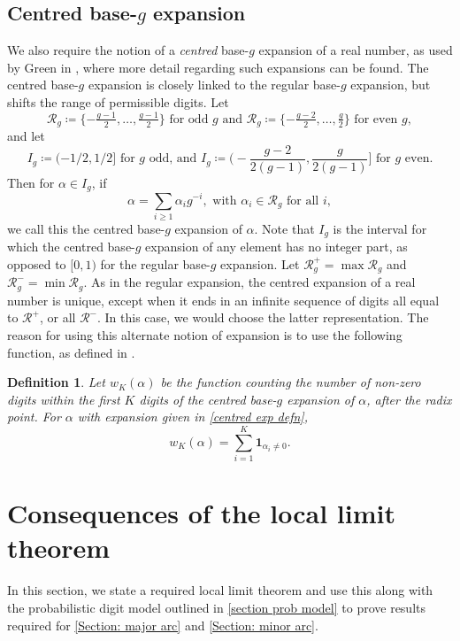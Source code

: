 \documentclass[hidelinks,11pt,reqno]{amsart}
\renewcommand{\geq}{\geqslant}
\newcommand{\ind}{\mathbf{1}}
\newtheorem{defn}[prop]{Definition}
\theoremstyle{remark}
\begin{document}
\subsection{Centred base-$g$ expansion}\label{section centred exp}
We also require the notion of a \textit{centred} base-$g$ expansion of a real number, as used by Green in \cite{green2025waring}, where more detail regarding such expansions can be found. The centred base-$g$ expansion is closely linked to the regular base-$g$ expansion, but shifts the range of permissible digits. Let
\[\mathcal{R}_{g}\coloneq \{-\tfrac{g-1}{2},\ldots, \tfrac{g-1}{2}\}\textrm{ for odd }g \textrm{ and }\mathcal{R}_{g}\coloneq\{-\tfrac{g-2}{2},\ldots, \tfrac{g}{2}\} \textrm{ for even }g,\]
and let
\begin{equation}\label{Ig defn}
    I_{g}\coloneq (-1/2,1/2]\textrm{ for }g \textrm{ odd, and } I_{g}\coloneq\Big (-\frac{g-2}{2(g-1)},\frac{g}{2(g-1)}\Big ]\textrm{ for }g\textrm{ even.}
\end{equation}
Then for $\alpha \in I_{g}$, if 
\begin{equation}\label{centred exp defn}
    \alpha=\sum_{i\geq 1}\alpha_{i}g^{-i}, \textrm{ with }\alpha_{i}\in \mathcal{R}_{g}\textrm{ for all }i,
\end{equation}
we call this the centred base-$g$ expansion of $\alpha$. Note that $I_{g}$ is the interval for which the centred base-$g$ expansion of any element has no integer part, as opposed to $[0,1)$ for the regular base-$g$ expansion. Let $\mathcal{R}_{g}^{+}=\max \mathcal{R}_{g}$ and $\mathcal{R}_{g}^{-}=\min \mathcal{R}_{g}$.
As in the regular expansion, the centred expansion of a real number is unique, except when it ends in an infinite sequence of digits all equal to $\mathcal{R}^{+}$, or all $\mathcal{R}^{-}$. In this case, we would choose the latter representation. The reason for using this alternate notion of expansion is to use the following function, as defined in \cite{green2025waring}. \begin{defn}\label{wk defn}
    Let $w_{K}(\alpha)$ be the function counting the number of non-zero digits within the first $K$ digits of the centred base-$g$ expansion of $\alpha$, after the radix point. For $\alpha$ with expansion given in \cref{centred exp defn}, 
    \[w_{K}(\alpha)=\sum_{i=1}^{K}\ind_{\alpha_{i}\neq 0}.\]
\end{defn}
\section{Consequences of the local limit theorem}\label{section Psi}
In this section, we state a required local limit theorem and use this along with the probabilistic digit model outlined in \cref{section prob model} to prove results required for \cref{Section: major arc} and \cref{Section: minor arc}.
\end{document}
